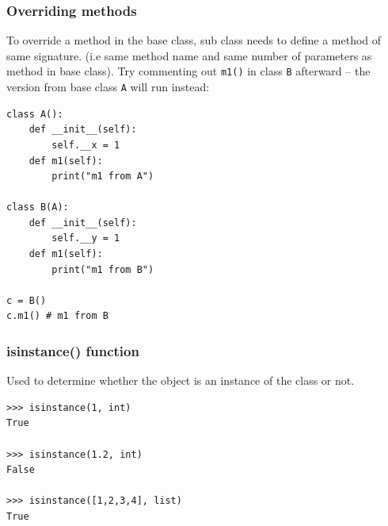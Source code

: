 \begin{frame}[fragile]\frametitle{Overriding methods}
To override a method in the base class, sub class needs to define a method of same signature. (i.e same method name and same number of parameters as method in base class). Try commenting out \lstinline|m1()| in class \texttt{B} afterward -- the version from base class \texttt{A} will run instead:

\begin{lstlisting}
class A():
    def __init__(self):
        self.__x = 1
    def m1(self):
        print("m1 from A")

class B(A):
    def __init__(self):
        self.__y = 1
    def m1(self):
        print("m1 from B")

c = B()
c.m1() # m1 from B
\end{lstlisting}
\end{frame}


\begin{frame}[fragile]\frametitle{isinstance() function}

Used to determine whether the object is an instance of the class or not.
\begin{lstlisting}
>>> isinstance(1, int)
True
 
>>> isinstance(1.2, int)
False
 
>>> isinstance([1,2,3,4], list)
True
\end{lstlisting}

\end{frame}


